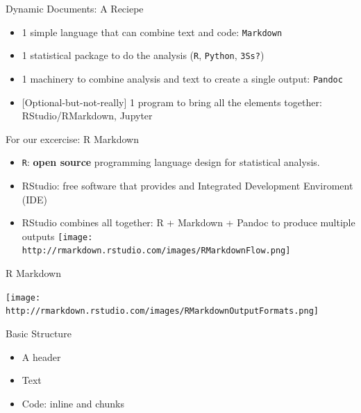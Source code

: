 \documentclass[ignorenonframetext,]{beamer}
\providecommand{\tightlist}{%
\setlength{\itemsep}{0pt}\setlength{\parskip}{0pt}}
\begin{document}
\begin{frame}[fragile]{Dynamic Documents: A Reciepe}

\begin{itemize}
\tightlist
\item
  1 simple language that can combine text and code: \texttt{Markdown}
\item
  1 statistical package to do the analysis (\texttt{R}, \texttt{Python},
  \texttt{3S\textquotesingle{}s?})
\item
  1 machinery to combine analysis and text to create a single output:
  \texttt{Pandoc}
\item
  {[}Optional-but-not-really{]} 1 program to bring all the elements
  together: RStudio/RMarkdown, Jupyter
\end{itemize}

\end{frame}

\begin{frame}[fragile]{For our excercise: R Markdown}

\begin{itemize}
\tightlist
\item
  \texttt{R}: \textbf{open source} programming language design for
  statistical analysis.\\
\item
  RStudio: free software that provides and Integrated Development
  Enviroment (IDE)\\
\item
  RStudio combines all together: R + Markdown + Pandoc to produce
  multiple outputs
  \texttt{[image: http://rmarkdown.rstudio.com/images/RMarkdownFlow.png]}
\end{itemize}

\end{frame}

\begin{frame}{R Markdown}

\texttt{[image: http://rmarkdown.rstudio.com/images/RMarkdownOutputFormats.png]}

\end{frame}

\begin{frame}{Basic Structure}

\begin{itemize}
\tightlist
\item
  A header
\item
  Text
\item
  Code: inline and chunks
\end{itemize}

\end{frame}
\end{document}
